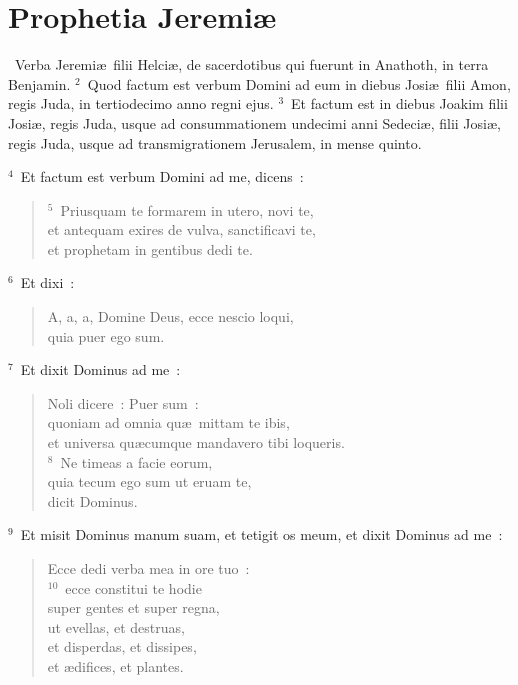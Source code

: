 {\centering \section*{Prophetia Jeremiæ}}\thispagestyle{empty}

~\lettrine[lines=10,image=true,loversize=0.05,lraise=-0.03]{V}{}erba Jeremi\ae\ filii Helci\ae , de sacerdotibus qui fuerunt in Anathoth, in terra Benjamin.
${}^{2}$~Quod factum est verbum Domini ad eum in diebus Josi\ae\ filii Amon, regis Juda, in tertiodecimo anno regni ejus.
${}^{3}$~Et factum est in diebus Joakim filii Josi\ae , regis Juda, usque ad consummationem undecimi anni Sedeci\ae , filii Josi\ae , regis Juda, usque ad transmigrationem Jerusalem, in mense quinto.


${}^{4}$~Et factum est verbum Domini ad me, dicens~:
\begin{flushleft}\begin{verse}${}^{5}$~Priusquam te formarem in utero, novi te,\\ et antequam exires de vulva, sanctificavi te,\\ et prophetam in gentibus dedi te.\end{verse}\end{flushleft}


${}^{6}$~Et dixi~: \begin{flushleft}\begin{verse}A, a, a, Domine Deus, ecce nescio loqui,\\ quia puer ego sum.\end{verse}\end{flushleft}


${}^{7}$~Et dixit Dominus ad me~: \begin{flushleft}\begin{verse}Noli dicere~: Puer sum~:\\ quoniam ad omnia qu\ae\ mittam te ibis,\\ et universa qu\ae cumque mandavero tibi loqueris.\\
${}^{8}$~Ne timeas a facie eorum,\\ quia tecum ego sum ut eruam te,\\ dicit Dominus.\end{verse}\end{flushleft}


${}^{9}$~Et misit Dominus manum suam, et tetigit os meum, et dixit Dominus ad me~: \begin{flushleft}\begin{verse}Ecce dedi verba mea in ore tuo~:\\
${}^{10}$~ecce constitui te hodie\\ super gentes et super regna,\\ ut evellas, et destruas,\\ et disperdas, et dissipes,\\ et \ae difices, et plantes.\end{verse}\end{flushleft}


